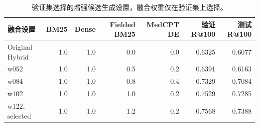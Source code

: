 \begin{table}[t]
\centering
\small
\caption{验证集选择的增强候选生成设置，融合权重仅在验证集上选择。}
\label{tab:enhanced-candidate-selection}
\begin{tabular}{lrrrrrr}
\toprule
融合设置 & BM25 & Dense & Fielded BM25 & MedCPT DE & 验证 R@100 & 测试 R@100 \\
\midrule
Original Hybrid & 1.0 & 1.0 & 0.0 & 0.0 & 0.6325 & 0.6077 \\
w052 & 1.0 & 1.0 & 0.5 & 0.2 & 0.6391 & 0.6163 \\
w084 & 1.0 & 1.0 & 0.8 & 0.4 & 0.7329 & 0.7084 \\
w102 & 1.0 & 1.0 & 1.0 & 0.2 & 0.7529 & 0.7285 \\
w122, selected & 1.0 & 1.0 & 1.2 & 0.2 & 0.7568 & 0.7388 \\
\bottomrule
\end{tabular}
\end{table}


